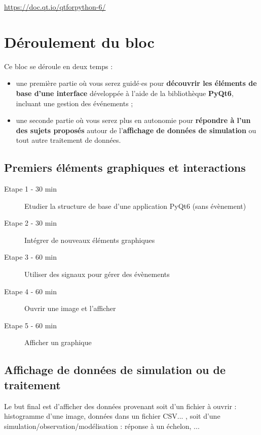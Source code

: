 \documentclass[a4paper,11pt,titlepage]{article} %
\begin{document}
\href{https://doc.qt.io/qtforpython-6/}{https://doc.qt.io/qtforpython-6/}


\newpage
\section{Déroulement du bloc}

Ce bloc se déroule en deux temps :

\begin{itemize}
	\item une première partie où vous serez guidé$\cdot$es pour \textbf{découvrir les éléments de base d'une interface} développée à l'aide de la bibliothèque \textbf{PyQt6}, incluant une gestion des événements ;
	\item une seconde partie où vous serez plus en autonomie pour \textbf{répondre à l'un des sujets proposés} autour de l'\textbf{affichage de données de simulation} ou tout autre traitement de données.
\end{itemize}

\medskip

\subsection{Premiers éléments graphiques et interactions}
	\begin{description}
		\item[Etape 1 - 30 min] Etudier la structure de base d'une application PyQt6 (sans évènement)
		\item[Etape 2 - 30 min] Intégrer de nouveaux éléments graphiques
		\item[Etape 3 - 60 min] Utiliser des signaux pour gérer des évènements
		\item[Etape 4 - 60 min] Ouvrir une image et l'afficher
		\item[Etape 5 - 60 min] Afficher un graphique
	\end{description}
	
	\bigskip
	
\subsection{Affichage de données de simulation ou de traitement}

Le but final est d'afficher des données provenant soit d'un fichier à ouvrir : histogramme d'une image, données dans un fichier CSV... , soit d'une simulation/observation/modélisation : réponse à un échelon, ...
\end{document}
